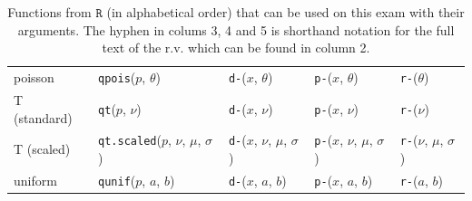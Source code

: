 \documentclass[12pt]{article}
\begin{document}
\begin{table}[htp]
\begin{tabular}{l | llll}

poisson & \texttt{qpois}($p$, $\theta$) 
& \texttt{d-}($x$, $\theta$)
& \texttt{p-}($x$, $\theta$) 
& \texttt{r-}($\theta$) \\

T (standard) & \texttt{qt}($p$, $\nu$) 
& \texttt{d-}($x$, $\nu$) 
& \texttt{p-}($x$, $\nu$)
& \texttt{r-}($\nu$) \\

T (scaled) & \texttt{qt.scaled}($p$, $\nu$, $\mu$, $\sigma$) 
& \texttt{d-}($x$, $\nu$, $\mu$, $\sigma$)
& \texttt{p-}($x$, $\nu$, $\mu$, $\sigma$) 
& \texttt{r-}($\nu$, $\mu$, $\sigma$) \\

uniform & \texttt{qunif}($p$, $a$, $b$) 
& \texttt{d-}($x$, $a$, $b$)
& \texttt{p-}($x$, $a$, $b$) 
& \texttt{r-}($a$, $b$) \\


\end{tabular}
\caption{Functions from $\texttt{R}$ (in alphabetical order) that can be used on this exam with their arguments. The hyphen in colums 3, 4 and 5 is shorthand notation for the full text of the r.v. which can be found in column 2.
}
\label{tab:eqs}
\end{table}
\end{document}
